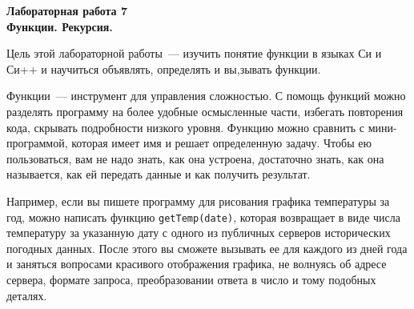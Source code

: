 \documentclass{article}
\begin{document}
\noindent
\textbf{Лабораторная работа 7}\\
{\Large \textbf{Функции. Рекурсия.}}\\
\strut\hfill{}

Цель этой лабораторной работы~--- изучить понятие функции в языках Си и Си++ и научиться объявлять, определять и вы,зывать функции.

Функции~--- инструмент для управления сложностью. С помощь функций можно разделять программу на более удобные осмысленные части, избегать повторения кода, скрывать подробности низкого уровня. Функцию можно сравнить с мини-программой, которая имеет имя и решает определенную задачу. Чтобы ею пользоваться, вам не надо знать, как она устроена, достаточно знать, как она называется, как ей передать данные и как получить результат.

Например, если вы пишете программу для рисования графика температуры за год, можно написать функцию \texttt{getTemp(date)}, которая возвращает в виде числа температуру за указанную дату с одного из публичных серверов исторических погодных данных. После этого вы сможете вызывать ее для каждого из дней года и заняться вопросами красивого отображения графика, не волнуясь об адресе сервера, формате запроса, преобразовании ответа в число и тому подобных деталях.
\end{document}
